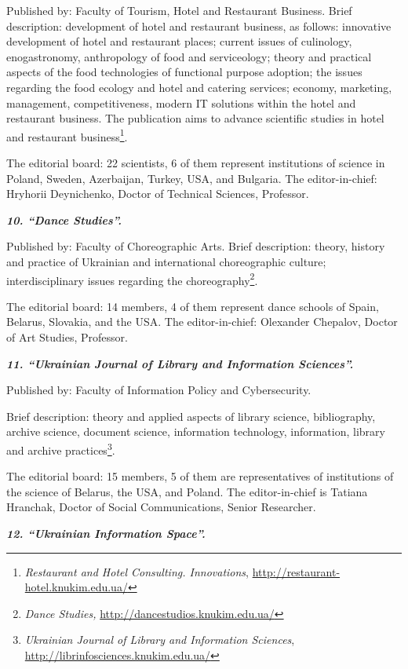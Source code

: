 \documentclass[a4paper,
fontsize=11pt,
oneside,
numbers=noperiodatend,
parskip=half-,
bibliography=totoc,
final
]{scrartcl}
\begin{document}
Published by: Faculty of Tourism, Hotel and Restaurant Business. Brief
description: development of hotel and restaurant business, as follows:
innovative development of hotel and restaurant places; current issues of
culinology, enogastronomy, anthropology of food and serviceology; theory
and practical aspects of the food technologies of functional purpose
adoption; the issues regarding the food ecology and hotel and catering
services; economy, marketing, management, competitiveness, modern IT
solutions within the hotel and restaurant business. The publication aims
to advance scientific studies in hotel and restaurant
business\footnote{\emph{Restaurant and Hotel Consulting. Innovations},
  \url{http://restaurant-hotel.knukim.edu.ua/}}.

The editorial board: 22 scientists, 6 of them represent institutions of
science in Poland, Sweden, Azerbaijan, Turkey, USA, and Bulgaria. The
editor-in-chief: Hryhorii Deynichenko, Doctor of Technical Sciences,
Professor.

\textbf{\emph{10. \enquote{Dance Studies}.}}

Published by: Faculty of Choreographic Arts. Brief description: theory,
history and practice of Ukrainian and international choreographic
culture; interdisciplinary issues regarding the choreography\footnote{\emph{Dance
  Studies,} \url{http://dancestudios.knukim.edu.ua/}}.

The editorial board: 14 members, 4 of them represent dance schools of
Spain, Belarus, Slovakia, and the USA. The editor-in-chief: Olexander
Chepalov, Doctor of Art Studies, Professor.

\textbf{\emph{11. \enquote{Ukrainian Journal of Library and Information
Sciences}.}}

Published by: Faculty of Information Policy and Cybersecurity.

Brief description: theory and applied aspects of library science,
bibliography, archive science, document science, information technology,
information, library and archive practices\footnote{\emph{Ukrainian
  Journal of Library and Information Sciences},
  \url{http://librinfosciences.knukim.edu.ua/}}.

The editorial board: 15 members, 5 of them are representatives of
institutions of the science of Belarus, the USA, and Poland. The
editor-in-chief is Tatiana Hranchak, Doctor of Social Communications,
Senior Researcher.

\textbf{\emph{12. \enquote{Ukrainian Information Space}.}}
\end{document}
